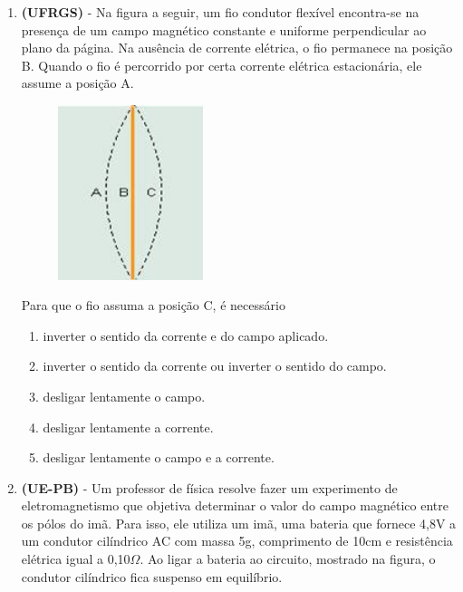 \documentclass[12pt,letterpaper,fleqn]{article}
\begin{document}
\begin{itemize}
\begin{enumerate}
            \item \textbf{(UFRGS)} - Na figura a seguir, um fio condutor flexível encontra-se na presença de um campo magnético constante e uniforme perpendicular ao plano da página. Na ausência de corrente elétrica, o fio permanece na posição B. Quando o fio é percorrido por certa corrente elétrica estacionária, ele assume a posição A.
            \begin{figure}[h]
                \centering
                \includegraphics[width=0.4\textwidth]{ex_14_forca.jpg}
            \end{figure}
            
            Para que o fio assuma a posição C, é necessário
            \begin{enumerate}
                \item inverter o sentido da corrente e do campo aplicado.
                \item inverter o sentido da corrente ou inverter o sentido do campo.
                \item desligar lentamente o campo.
                \item desligar lentamente a corrente.
                \item desligar lentamente o campo e a corrente.
            \end{enumerate}
            
            \item \textbf{(UE-PB)} - Um professor de física resolve fazer um experimento de eletromagnetismo que objetiva determinar o valor do campo magnético entre os pólos do imã. Para isso, ele utiliza um imã, uma bateria que fornece 4,8V a um condutor cilíndrico AC com massa 5g, comprimento de 10cm e resistência elétrica igual a 0,10$\Omega$. Ao ligar a bateria ao circuito, mostrado na figura, o condutor cilíndrico fica suspenso em equilíbrio.
            

\end{enumerate}
\end{itemize}
\end{document}
